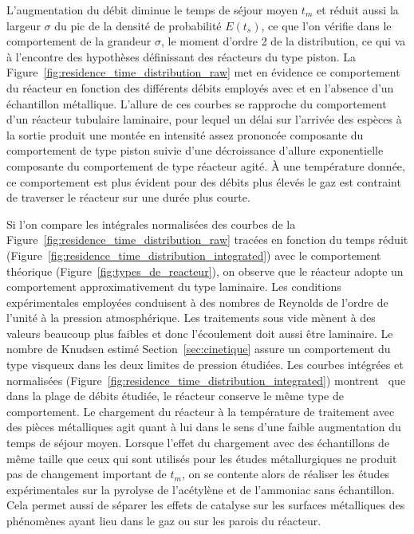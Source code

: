 L'augmentation du débit diminue le temps de séjour moyen $t_{m}$ et réduit aussi la largeur $\sigma$ du pic de la densité de probabilité $E(t_{s})$, ce que l'on vérifie dans le comportement de la grandeur $\sigma$, le moment d'ordre 2 de la distribution, ce qui va à l'encontre des hypothèses définissant des réacteurs du type piston. La Figure~\ref{fig:residence_time_distribution_raw} met en évidence ce comportement du réacteur en fonction des différents débits employés avec et en l'absence d'un échantillon métallique. L'allure de ces courbes se rapproche du comportement d'un réacteur tubulaire laminaire, pour lequel un délai sur l'arrivée des espèces à la sortie produit une montée en intensité assez prononcée \textendash{} composante du comportement de type piston \textendash{} suivie d'une décroissance d'allure exponentielle \textemdash{} composante du comportement de type réacteur agité. À une température donnée, ce comportement est plus évident pour des débits plus élevés \textemdash{} le gaz est contraint de traverser le
réacteur sur une durée plus courte.

Si l'on compare les intégrales normalisées des courbes de la Figure~\ref{fig:residence_time_distribution_raw} tracées en fonction du temps réduit (Figure~\ref{fig:residence_time_distribution_integrated}) avec le comportement théorique (Figure~\ref{fig:types_de_reacteur}), on observe que le réacteur adopte un comportement approximativement du type laminaire. Les conditions expérimentales employées conduisent à des nombres de Reynolds de l'ordre de l'unité à la pression atmosphérique. Les traitements sous vide mènent à des valeurs beaucoup plus faibles et donc l'écoulement doit aussi être laminaire. Le nombre de Knudsen estimé Section~\ref{sec:cinetique} assure un comportement du type visqueux dans les deux limites de pression étudiées. Les courbes intégrées et normalisées (Figure~\ref{fig:residence_time_distribution_integrated})  montrent~\cite{Fogler1999} que dans la plage de débits étudiée, le réacteur conserve le même type de comportement. Le chargement du réacteur à la température de traitement avec des pièces métalliques agit quant à lui dans le sens d'une faible augmentation du temps de séjour  moyen. Lorsque l'effet du chargement avec des échantillons de même taille que ceux qui sont utilisés pour les études métallurgiques ne produit pas de changement important de $t_{m}$, on se contente alors de réaliser les études expérimentales sur la pyrolyse de l'acétylène et de l'ammoniac sans échantillon. Cela permet aussi de séparer les effets de catalyse sur les surfaces métalliques des phénomènes ayant lieu dans le gaz ou sur les parois du réacteur.

